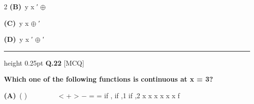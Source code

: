 \documentclass[a4paper,10pt,twoside]{article}
\begin{document}
\begin{multicols}{2}
\textbf{(B)}~y \newline x \newline ′ \newline $\oplus$\par\vspace{2pt}\noindent
\textbf{(C)}~y \newline x $\oplus$ \newline ′\par\vspace{2pt}\noindent
\textbf{(D)}~y \newline x \newline ′ \newline $\oplus$ \newline ′
\par\vspace{6pt}\hrule height 0.25pt\vspace{6pt}
\noindent\textbf{Q.22} \hfill {\footnotesize\textsf{[MCQ]}}
\par\vspace{2pt}
{\bfseries Which one of the following functions is continuous at x = 3? \par}
\par\vspace{2pt}\noindent
\textbf{(A)}~( ) \newline  \newline  \newline  \newline  \newline  \newline  \newline  \newline < \newline + \newline > \newline − \newline = \newline =  \newline if \newline ,    \newline if \newline ,1  \newline if \newline ,2 \newline x \newline x \newline x \newline x \newline x \newline x \newline f\par\vspace{2pt}\noindent

\end{multicols}
\end{document}
